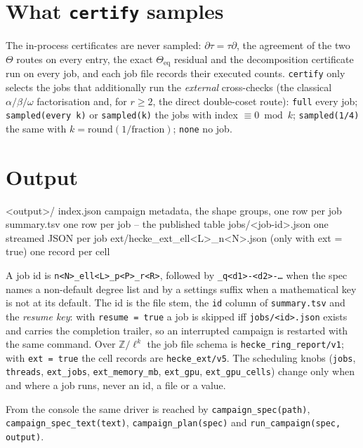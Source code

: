 \documentclass[11pt,openany]{report}
\newcommand{\Z}{\mathbb{Z}}
\newcommand{\file}[1]{\nolinkurl{#1}}
\newcommand{\vb}[1]{\texttt{#1}}
\begin{document}
\section{What \texttt{certify} samples}\label{sec:certify}

The in-process certificates are never sampled: $\partial\tau=\tau\partial$, the agreement of the two
$\Theta$ routes on every entry, the exact $\Theta_{\mathrm{eq}}$ residual and the decomposition
certificate run on every job, and each job file records their executed counts. \vb{certify} only selects
the jobs that additionally run the \emph{external} cross-checks (the classical $\alpha/\beta/\omega$
factorisation and, for $r\ge2$, the direct double-coset route): \vb{full} every job;
\vb{sampled(every k)} or \vb{sampled(k)} the jobs with index $\equiv 0 \bmod k$; \vb{sampled(1/4)} the
same with $k=\mathrm{round}(1/\text{fraction})$; \vb{none} no job.

\section{Output}\label{sec:campaign-out}

\begin{spec}
<output>/
  index.json            campaign metadata, the shape groups, one row per job
  summary.tsv           one row per job -- the published table
  jobs/<job-id>.json    one streamed JSON per job
  ext/hecke_ext_ell<L>_n<N>.json      (only with ext = true) one record per cell
\end{spec}
A job id is \texttt{n<N>\_ell<L>\_p<P>\_r<R>}, followed by \texttt{\_q<d1>-<d2>-\dots} when the spec
names a non-default degree list and by a settings suffix when a mathematical key is not at its default.
The id is the file stem, the \texttt{id} column of \file{summary.tsv} and the \emph{resume key}:
with \vb{resume = true} a job is skipped iff \file{jobs/<id>.json} exists and carries the completion
trailer, so an interrupted campaign is restarted with the same command. Over $\Z/\ell^k$ the job file
schema is \texttt{hecke\_ring\_report/v1}; with \vb{ext = true} the cell records are
\texttt{hecke\_ext/v5}. The scheduling knobs (\vb{jobs}, \vb{threads}, \vb{ext\_jobs},
\vb{ext\_memory\_mb}, \vb{ext\_gpu}, \vb{ext\_gpu\_cells}) change only when and where a job runs, never
an id, a file or a value.

From the console the same driver is reached by \vb{campaign\_spec(path)}, \vb{campaign\_spec\_text(text)},
\vb{campaign\_plan(spec)} and \vb{run\_campaign(spec, output)}.
\end{document}
